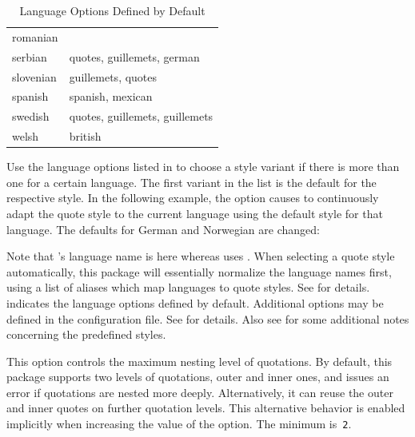 \documentclass{ltxdockit}[2010/09/26]
\begin{document}
\begin{optionlist}
\begin{table}
\begin{tabularx}{\columnwidth}{@{}P@{}X@{}}
    romanian                          &                                            \\
    serbian                           & quotes, guillemets, german                 \\
    slovenian                         & guillemets, quotes                         \\
    spanish                           & spanish, mexican                           \\
    swedish                           & quotes, guillemets, guillemets\*           \\
    welsh                             & british                                    \\
    \bottomrule
  \end{tabularx}
  \caption[Language Options]{Language Options Defined by Default}
  \label{tab:lng}
\end{table}


Use the language options listed in  to choose a style variant if there is more than one for a certain language. The first variant in the list is the default for the respective style. In the following example, the  option causes  to continuously adapt the quote style to the current language using the default style for that language. The defaults for German and Norwegian are changed:

\begin{ltxcode}
\usepackage[english,ngerman]{babel}
\usepackage[autostyle,german=guillemets,norwegian=quotes]{csquotes}
\end{ltxcode}
%
Note that 's language name is  here whereas  uses . When selecting a quote style automatically, this package will essentially normalize the language names first, using a list of aliases which map languages to quote styles. See  for details.  indicates the language options defined by default. Additional options may be defined in the configuration file. See  for details. Also see  for some additional notes concerning the predefined styles.


This option controls the maximum nesting level of quotations. By default, this package supports two levels of quotations, outer and inner ones, and issues an error if quotations are nested more deeply. Alternatively, it can reuse the outer and inner quotes on further quotation levels. This alternative behavior is enabled implicitly when increasing the value of the  option. The minimum is~\texttt{2}.


\end{optionlist}
\end{document}
